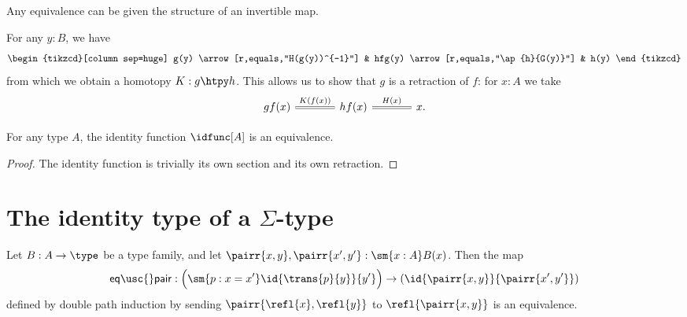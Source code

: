 \begin{defn}\label{defn:inv_equiv}
Any equivalence can be given the structure of an invertible map.
\end{defn}

\begin{constr}
For any $y:B$, we have 
\begin{equation*}
\begin{tikzcd}[column sep=huge]
g(y) \arrow[r,equals,"H(g(y))^{-1}"] & hfg(y) \arrow[r,equals,"\ap{h}{G(y)}"] & h(y)
\end{tikzcd}
\end{equation*} 
from which we obtain a homotopy $K:g\htpy h$.
This allows us to show that $g$ is a retraction of $f$: for $x:A$ we take
\begin{equation*}
\begin{tikzcd}[column sep=large]
gf(x) \arrow[r,equals,"K(f(x))"] & hf(x) \arrow[r,equals,"H(x)"] & x.
\end{tikzcd}\qedhere
\end{equation*}
\end{constr}

\begin{thm}\label{thm:id_equiv}
For any type $A$, the identity function $\idfunc[A]$ is an equivalence.
\end{thm}

\begin{proof}
The identity function is trivially its own section and its own retraction.
\end{proof}

\section{The identity type of a \texorpdfstring{$\Sigma$-}{dependent pair }type}
\begin{thm}\label{thm:eq_sigma}
Let $B:A\to\type$ be a type family, and let $\pairr{x,y},\pairr{x',y'}:\sm{x:A}B(x)$. Then the map
\begin{equation*}
\mathsf{eq\usc{}pair} : \Big(\sm{p:x=x'}\id{\trans{p}{y}}{y'}\Big)\to(\id{\pairr{x,y}}{\pairr{x',y'}})
\end{equation*}
defined by double path induction by sending $\pairr{\refl{x},\refl{y}}$ to $\refl{\pairr{x,y}}$ is an equivalence.
\end{thm}

